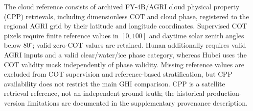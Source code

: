 The cloud reference consists of archived FY-4B/AGRI cloud physical property (CPP) retrievals, including dimensionless COT and cloud phase, registered to the regional AGRI grid by their latitude and longitude coordinates. Supervised COT pixels require finite reference values in $[0,100]$ and daytime solar zenith angles below $80^\circ$; valid zero-COT values are retained. Hunan additionally requires valid AGRI inputs and a valid clear/water/ice phase category, whereas Hubei uses the COT validity mask independently of phase validity. Missing reference values are excluded from COT supervision and reference-based stratification, but CPP availability does not restrict the main GHI comparison. CPP is a satellite retrieval reference, not an independent ground truth; the historical production-version limitations are documented in the supplementary provenance description.

